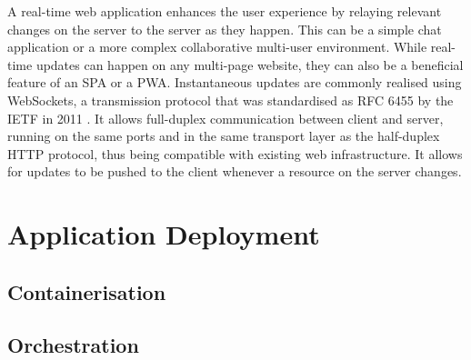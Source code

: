 A real-time web application enhances the user experience by relaying relevant changes on the server to the server as they happen. This can be a simple chat application or a more complex collaborative multi-user environment. While real-time updates can happen on any multi-page website, they can also be a beneficial feature of an \ac{SPA} or a \ac{PWA}. Instantaneous updates are commonly realised using WebSockets, a transmission protocol that was standardised as \ac{RFC} 6455 by the \ac{IETF} in 2011 \parencite{webSocketsProtocolRfc}. It allows full-duplex communication between client and server, running on the same ports and in the same transport layer as the half-duplex \ac{HTTP} protocol, thus being compatible with existing web infrastructure. It allows for updates to be pushed to the client whenever a resource on the server changes.



\section{Application Deployment}

\subsection{Containerisation}

\subsection{Orchestration}

